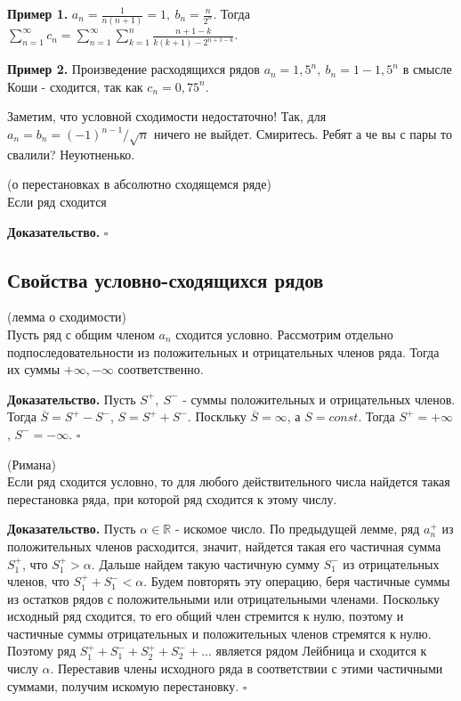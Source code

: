 \textbf{Пример 1.} $a_n=\frac{1}{n(n+1)}=1,~b_n=\frac{n}{2^n}$. Тогда
$\sum\limits_{n=1}^{\infty} c_n=\sum\limits_{n=1}^{\infty} \sum\limits_{k=1}
^{n} \frac{n+1-k}{k(k+1)-2^{n+1-k}}$.

\textbf{Пример 2.} Произведение расходящихся рядов $a_n=1,5^n,~b_n=1-1,5^n$
в смысле Коши - сходится, так как $c_n=0,75^n$.

Заметим, что условной сходимости недостаточно! Так, для $a_n=b_n=(-1)^{n-1}/
\sqrt{n}$ ничего не выйдет. Смиритесь. Ребят а че вы с пары то свалили?
Неуютненько. %

\begin{theor}
    (о перестановках в абсолютно сходящемся ряде)\\
    Если ряд сходится
\end{theor}
\textbf{Доказательство.}  
$\square$ \\



\subsection{Свойства условно-сходящихся рядов}
\begin{theor} (лемма о сходимости)\\
    Пусть ряд с общим членом $a_n$ сходится условно. 
    Рассмотрим отдельно подпоследовательности из положительных и 
    отрицательных членов ряда. Тогда их суммы 
    $+\infty,-\infty$ соответственно. 
\end{theor}
\textbf{Доказательство.} Пусть $S^+,~S^-$ - суммы положительных и 
отрицательных членов. Тогда $\overline{S}=S^+-S^-$, $S=S^++S^-$.
Поскльку $\overline{S}=\infty$, а $S=const$. Тогда $S^+=+\infty$, 
$S^-=-\infty$. $\square$ 
\begin{theor}
    (Римана)\\
    Если ряд сходится условно, то для любого действительного числа найдется
    такая перестановка ряда, при которой ряд сходится к этому числу.
\end{theor}
\textbf{Доказательство.} 
Пусть $\alpha\in\mathbb{R}$ - искомое число. По предыдущей лемме, 
ряд $a^+_n$ из положительных членов расходится, значит, найдется такая его
частичная сумма $S^+_1$, что $S^+_1>\alpha$. Дальше найдем 
такую частичную сумму $S^-_1$ из отрицательных членов, что 
$S^+_1+S^-_1<\alpha$. Будем повторять эту операцию, беря частичные суммы
из остатков рядов с положительными или отрицательными членами. 
Поскольку исходный ряд сходится, то его общий член
стремится к нулю, поэтому и частичные суммы отрицательных и положительных 
членов стремятся к нулю. Поэтому ряд $S^+_1+S^-_1+S^+_2+S^-_2+...$ 
является рядом Лейбница и сходится к числу $\alpha$. Переставив члены 
исходного ряда в соответствии с этими частичными суммами, получим 
искомую перестановку. $\square$ 

